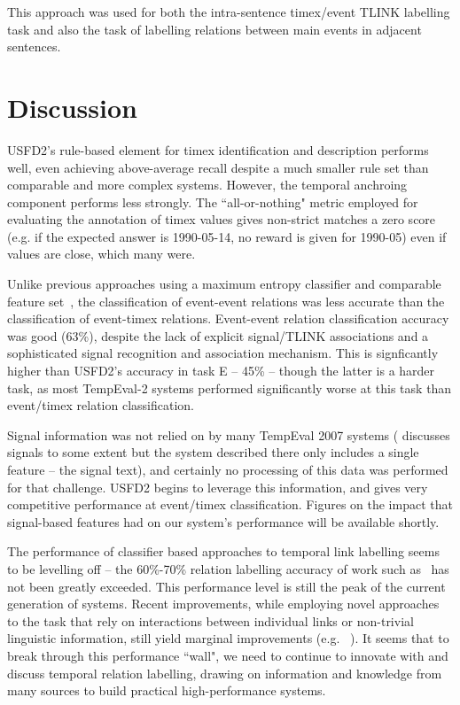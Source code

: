 \documentclass[11pt]{article}
\begin{document}
This approach was used for both the intra-sentence timex/event TLINK labelling task and also the task of labelling relations between main events in adjacent sentences.

\section{Discussion}
\label{discussion}
USFD2's rule-based element for timex identification and description performs well, even achieving above-average recall despite a much smaller rule set than comparable and more complex systems. However, the temporal anchroing component performs less strongly. The ``all-or-nothing" metric employed for evaluating the annotation of timex values gives non-strict matches a zero score (e.g. if the expected answer is 1990-05-14, no reward is given for 1990-05) even if values are close, which many were.

Unlike previous approaches using a maximum entropy classifier and comparable feature set~\cite{mani2006machine,derczynski2010signals}, the classification of event-event relations was less accurate than the classification of event-timex relations. Event-event relation classification accuracy was good (63\%), despite the lack of explicit signal/TLINK associations and a sophisticated signal recognition and association mechanism. This is signficantly higher than USFD2's accuracy in task E -- 45\% -- though the latter is a harder task, as most TempEval-2 systems performed significantly worse at this task than event/timex relation classification.

Signal information was not relied on by many TempEval 2007 systems ( discusses signals to some extent but the system described there only includes a single feature -- the signal text), and certainly no processing of this data was performed for that challenge. USFD2 begins to leverage this information, and gives very competitive performance at event/timex classification. Figures on the impact that signal-based features had on our system's performance will be available shortly.

The performance of classifier based approaches to temporal link labelling seems to be levelling off -- the 60\%-70\% relation labelling accuracy of work such as~ has not been greatly exceeded. This performance level is still the peak of the current generation of systems. Recent improvements, while employing novel approaches to the task that rely on interactions between individual links or non-trivial linguistic information, still yield marginal improvements (e.g. ~). It seems that to break through this performance ``wall", we need to continue to innovate with and discuss temporal relation labelling, drawing on information and knowledge from many sources to build practical high-performance systems.
\end{document}
